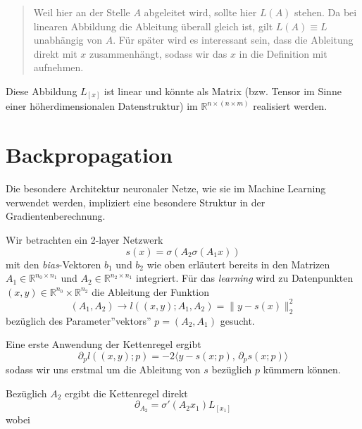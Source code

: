 \documentclass[
]{book}
\newenvironment {JHSAYS} [0] {\begin{quote}\color{jhsc}} {\end{quote}}
\theoremstyle{definition}
\theoremstyle{definition}
\theoremstyle{definition}
\theoremstyle{definition}
\theoremstyle{remark}
\begin{document}
\leavevmode{}%
\begin{JHSAYS}
Weil hier an der Stelle \(A\) abgeleitet wird, sollte hier \(L(A)\) stehen. Da bei
linearen Abbildung die Ableitung überall gleich ist, gilt \(L(A)\equiv L\)
unabhängig von \(A\). Für später wird es interessant sein, dass
die Ableitung direkt mit \(x\) zusammenhängt, sodass wir das \(x\) in die
Definition mit aufnehmen.

\end{JHSAYS}

Diese Abbildung \(L_{[x]}\) ist linear und könnte als Matrix (bzw. Tensor im Sinne
einer höherdimensionalen Datenstruktur)
im \(\mathbb R^{n \times (n\times m)}\) realisiert werden.

\hypertarget{backpropagation}{%
\section{Backpropagation}\label{backpropagation}}

Die besondere Architektur neuronaler Netze, wie sie im Machine Learning
verwendet werden, impliziert eine besondere Struktur in der
Gradientenberechnung.

Wir betrachten ein 2-layer Netzwerk
\begin{equation*}
s(x) = \sigma(A_2 \sigma(A_1x))
\end{equation*}
mit den \emph{bias}-Vektoren \(b_1\) und \(b_2\) wie oben erläutert bereits in den Matrizen \(A_1\in \mathbb R^{n_0\times n_1}\) und \(A_2 \in \mathbb R^{n_2\times n_1}\) integriert.
Für das \emph{learning} wird zu Datenpunkten \((x, y) \in \mathbb R^{n_0}\times \mathbb R^{n_2}\) die Ableitung der Funktion
\begin{equation*}
(A_1, A_2) \to l((x,y); A_1, A_2) = \|y-s(x)\|_2^2
\end{equation*}
bezüglich des Parameter''vektors'' \(p=(A_2, A_1)\) gesucht.

Eine erste Anwendung der Kettenregel ergibt
\begin{equation*}
\partial_p l((x,y); p) = -2\bigl \langle y-s(x;p), \, \partial_p s(x;p)\bigr\rangle 
\end{equation*}
sodass wir uns erstmal um die Ableitung von \(s\) bezüglich \(p\) kümmern
können.

Bezüglich \(A_2\) ergibt die Kettenregel direkt
\begin{equation*}
\partial_{A_2} = \sigma'(A_2x_1)L_{[x_1]}
\end{equation*}
wobei
\end{document}

